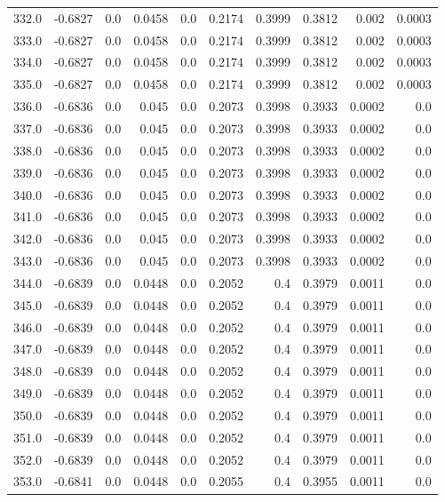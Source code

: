 \begin{longtable}{lrrrrrrrrr}
332.0 & -0.6827 & 0.0 & 0.0458 & 0.0 & 0.2174 & 0.3999 & 0.3812 & 0.002 & 0.0003 \\
333.0 & -0.6827 & 0.0 & 0.0458 & 0.0 & 0.2174 & 0.3999 & 0.3812 & 0.002 & 0.0003 \\
334.0 & -0.6827 & 0.0 & 0.0458 & 0.0 & 0.2174 & 0.3999 & 0.3812 & 0.002 & 0.0003 \\
335.0 & -0.6827 & 0.0 & 0.0458 & 0.0 & 0.2174 & 0.3999 & 0.3812 & 0.002 & 0.0003 \\
336.0 & -0.6836 & 0.0 & 0.045 & 0.0 & 0.2073 & 0.3998 & 0.3933 & 0.0002 & 0.0 \\
337.0 & -0.6836 & 0.0 & 0.045 & 0.0 & 0.2073 & 0.3998 & 0.3933 & 0.0002 & 0.0 \\
338.0 & -0.6836 & 0.0 & 0.045 & 0.0 & 0.2073 & 0.3998 & 0.3933 & 0.0002 & 0.0 \\
339.0 & -0.6836 & 0.0 & 0.045 & 0.0 & 0.2073 & 0.3998 & 0.3933 & 0.0002 & 0.0 \\
340.0 & -0.6836 & 0.0 & 0.045 & 0.0 & 0.2073 & 0.3998 & 0.3933 & 0.0002 & 0.0 \\
341.0 & -0.6836 & 0.0 & 0.045 & 0.0 & 0.2073 & 0.3998 & 0.3933 & 0.0002 & 0.0 \\
342.0 & -0.6836 & 0.0 & 0.045 & 0.0 & 0.2073 & 0.3998 & 0.3933 & 0.0002 & 0.0 \\
343.0 & -0.6836 & 0.0 & 0.045 & 0.0 & 0.2073 & 0.3998 & 0.3933 & 0.0002 & 0.0 \\
344.0 & -0.6839 & 0.0 & 0.0448 & 0.0 & 0.2052 & 0.4 & 0.3979 & 0.0011 & 0.0 \\
345.0 & -0.6839 & 0.0 & 0.0448 & 0.0 & 0.2052 & 0.4 & 0.3979 & 0.0011 & 0.0 \\
346.0 & -0.6839 & 0.0 & 0.0448 & 0.0 & 0.2052 & 0.4 & 0.3979 & 0.0011 & 0.0 \\
347.0 & -0.6839 & 0.0 & 0.0448 & 0.0 & 0.2052 & 0.4 & 0.3979 & 0.0011 & 0.0 \\
348.0 & -0.6839 & 0.0 & 0.0448 & 0.0 & 0.2052 & 0.4 & 0.3979 & 0.0011 & 0.0 \\
349.0 & -0.6839 & 0.0 & 0.0448 & 0.0 & 0.2052 & 0.4 & 0.3979 & 0.0011 & 0.0 \\
350.0 & -0.6839 & 0.0 & 0.0448 & 0.0 & 0.2052 & 0.4 & 0.3979 & 0.0011 & 0.0 \\
351.0 & -0.6839 & 0.0 & 0.0448 & 0.0 & 0.2052 & 0.4 & 0.3979 & 0.0011 & 0.0 \\
352.0 & -0.6839 & 0.0 & 0.0448 & 0.0 & 0.2052 & 0.4 & 0.3979 & 0.0011 & 0.0 \\
353.0 & -0.6841 & 0.0 & 0.0448 & 0.0 & 0.2055 & 0.4 & 0.3955 & 0.0011 & 0.0 \\

\end{longtable}
